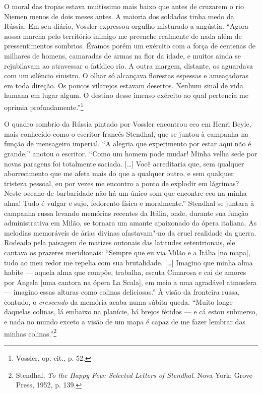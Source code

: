 O moral das tropas estava muitíssimo mais baixo que antes de cruzarem o
rio Niemen menos de dois meses antes. A maioria dos soldados tinha medo
da Rússia. Em seu diário, Vossler expressou orgulho misturado a
angústia. ``Agora nossa marcha pelo território inimigo me preenche
realmente de nada além de pressentimentos sombrios. Éramos porém um
exército com a força de centenas de milhares de homens, camaradas de
armas na flor da idade, e muitos ainda se rejubilavam ao atravessar o
fatídico rio. A outra margem, distante, os aguardava com um silêncio
sinistro. O olhar só alcançava florestas espessas e ameaçadoras em toda
direção. Os poucos vilarejos estavam desertos. Nenhum sinal de vida
humana em lugar algum. O destino desse imenso exército ao qual pertencia
me oprimia profundamente.''\footnote{Vossler, op. cit., p. 52.}

O quadro sombrio da Rússia pintado por Vossler encontrou eco em Henri
Beyle, mais conhecido como o escritor francês Stendhal, que se juntou à
campanha na função de mensageiro imperial. ``A alegria que experimento
por estar aqui não é grande,'' anotou o escritor. ``Como um homem pode
mudar! Minha velha sede por novas paragens foi totalmente saciada.
[\ldots{}] Você acreditaria que, sem qualquer aborrecimento que me afeta
mais do que a qualquer outro, e sem qualquer tristeza pessoal, eu por
vezes me encontro a ponto de explodir em lágrimas? Neste oceano de
barbaridade não há um único som que encontre eco na minha alma! Tudo é
vulgar e sujo, fedorento física e moralmente.'' Stendhal se juntara à
campanha russa levando memórias recentes da Itália, onde, durante sua
função administrativa em Milão, se tornara um amante apaixonado da ópera
italiana. As melodias memoráveis de árias divinas afastavam"-no da cruel
realidade da guerra. Rodeado pela paisagem de matizes outonais das
latitudes setentrionais, ele cantava os prazeres meridionais: ``Sempre
que eu via Milão e a Itália {[}no mapa{]}, tudo ao meu redor me repelia
com sua brutalidade. [\ldots{}] Imagino que minha alma habite --- aquela
alma que compõe, trabalha, escuta Cimarosa e cai de amores por Angela
{[}uma cantora na ópera La Scala{]}, em meio a uma agradável atmosfera ---
imagino essas alturas como colinas deliciosas.'' À visão da fronteira
russa, contudo, o \textit{crescendo} da memória acaba numa súbita queda.
``Muito longe daquelas colinas, lá embaixo na planície, há brejos
fétidos --- e cá estou submerso, e nada no mundo exceto a visão de um mapa
é capaz de me fazer lembrar das minhas colinas.''\footnote{Stendhal, \textit{To the Happy Few: Selected Letters of Stendhal}. Nova York: Grove Press, 1952, p. 139.}

